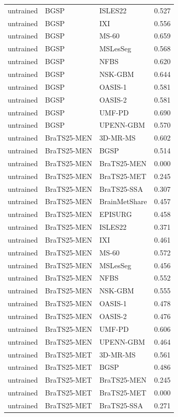 \begin{tabular}{lllr}
untrained & BGSP & ISLES22 & 0.527 \\
untrained & BGSP & IXI & 0.556 \\
untrained & BGSP & MS-60 & 0.659 \\
untrained & BGSP & MSLesSeg & 0.568 \\
untrained & BGSP & NFBS & 0.620 \\
untrained & BGSP & NSK-GBM & 0.644 \\
untrained & BGSP & OASIS-1 & 0.581 \\
untrained & BGSP & OASIS-2 & 0.581 \\
untrained & BGSP & UMF-PD & 0.690 \\
untrained & BGSP & UPENN-GBM & 0.570 \\
untrained & BraTS25-MEN & 3D-MR-MS & 0.602 \\
untrained & BraTS25-MEN & BGSP & 0.514 \\
untrained & BraTS25-MEN & BraTS25-MEN & 0.000 \\
untrained & BraTS25-MEN & BraTS25-MET & 0.245 \\
untrained & BraTS25-MEN & BraTS25-SSA & 0.307 \\
untrained & BraTS25-MEN & BrainMetShare & 0.457 \\
untrained & BraTS25-MEN & EPISURG & 0.458 \\
untrained & BraTS25-MEN & ISLES22 & 0.371 \\
untrained & BraTS25-MEN & IXI & 0.461 \\
untrained & BraTS25-MEN & MS-60 & 0.572 \\
untrained & BraTS25-MEN & MSLesSeg & 0.456 \\
untrained & BraTS25-MEN & NFBS & 0.552 \\
untrained & BraTS25-MEN & NSK-GBM & 0.555 \\
untrained & BraTS25-MEN & OASIS-1 & 0.478 \\
untrained & BraTS25-MEN & OASIS-2 & 0.476 \\
untrained & BraTS25-MEN & UMF-PD & 0.606 \\
untrained & BraTS25-MEN & UPENN-GBM & 0.464 \\
untrained & BraTS25-MET & 3D-MR-MS & 0.561 \\
untrained & BraTS25-MET & BGSP & 0.486 \\
untrained & BraTS25-MET & BraTS25-MEN & 0.245 \\
untrained & BraTS25-MET & BraTS25-MET & 0.000 \\
untrained & BraTS25-MET & BraTS25-SSA & 0.271 \\

\end{tabular}

